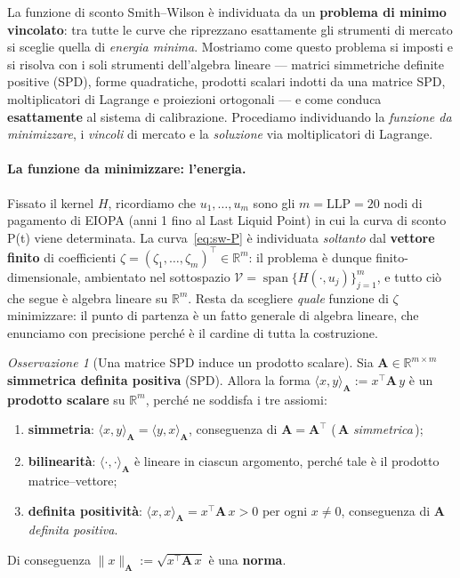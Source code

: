 \documentclass[11pt,a4paper]{article}
\theoremstyle{plain}
\theoremstyle{definition}
\theoremstyle{remark}
\newtheorem*{osservazione}{Osservazione}
\newcommand{\LLP}{\ensuremath{\mathrm{LLP}}}
\newcommand{\transp}{^{\!\top}}
\begin{document}
La funzione di sconto Smith--Wilson \`e individuata da un \textbf{problema di minimo
vincolato}: tra tutte le curve che riprezzano esattamente gli strumenti di mercato si
sceglie quella di \emph{energia minima}. Mostriamo come questo problema si imposti e si
risolva con i soli strumenti dell'algebra lineare --- matrici simmetriche definite positive
(SPD), forme quadratiche, prodotti scalari indotti da una matrice SPD, moltiplicatori di
Lagrange e proiezioni ortogonali --- e come conduca \textbf{esattamente} al sistema di
calibrazione. Procediamo individuando la \emph{funzione da minimizzare}, i \emph{vincoli} di mercato
e la \emph{soluzione} via moltiplicatori di Lagrange.

\paragraph{La funzione da minimizzare: l'energia.}
Fissato il kernel $H$, ricordiamo che $u_1,\ldots,u_m$ sono gli $m=\LLP=20$ nodi di
pagamento di EIOPA (anni 1 fino al Last Liquid Point) in cui la curva di sconto P(t) viene
determinata. La curva~\eqref{eq:sw-P} \`e individuata \emph{soltanto} dal
\textbf{vettore finito} di coefficienti $\zeta = (\zeta_1,\dots,\zeta_m)\transp \in
\mathbb{R}^m$: il problema \`e dunque finito-dimensionale, ambientato nel sottospazio
$\mathcal{V} = \operatorname{span}\{H(\cdot,u_j)\}_{j=1}^{m}$, e tutto ci\`o che segue \`e
algebra lineare su $\mathbb{R}^m$. Resta da scegliere \emph{quale} funzione di $\zeta$
minimizzare: il punto di partenza \`e un fatto generale di algebra lineare, che enunciamo con
precisione perch\'e \`e il cardine di tutta la costruzione.

\begin{osservazione}[Una matrice SPD induce un prodotto scalare]
\label{oss:spd-prodotto}
Sia $\mathbf{A}\in\mathbb{R}^{m\times m}$ \textbf{simmetrica definita positiva} (SPD).
Allora la forma $\langle x,y\rangle_{\mathbf{A}} := x\transp \mathbf{A}\, y$ \`e un
\textbf{prodotto scalare} su $\mathbb{R}^m$, perch\'e ne soddisfa i tre assiomi:
\begin{enumerate}
  \item \textbf{simmetria}: $\langle x,y\rangle_{\mathbf{A}} = \langle y,x\rangle_{\mathbf{A}}$,
        conseguenza di $\mathbf{A} = \mathbf{A}\transp$ (\,$\mathbf{A}$ \emph{simmetrica}\,);
  \item \textbf{bilinearit\`a}: $\langle \cdot,\cdot\rangle_{\mathbf{A}}$ \`e lineare in
        ciascun argomento, perch\'e tale \`e il prodotto matrice--vettore;
  \item \textbf{definita positivit\`a}: $\langle x,x\rangle_{\mathbf{A}} = x\transp\mathbf{A}\,x > 0$
        per ogni $x\neq 0$, conseguenza di $\mathbf{A}$ \emph{definita positiva}.
\end{enumerate}
Di conseguenza $\|x\|_{\mathbf{A}} := \sqrt{x\transp \mathbf{A}\, x}$ \`e una \textbf{norma}.
\end{osservazione}
\end{document}
